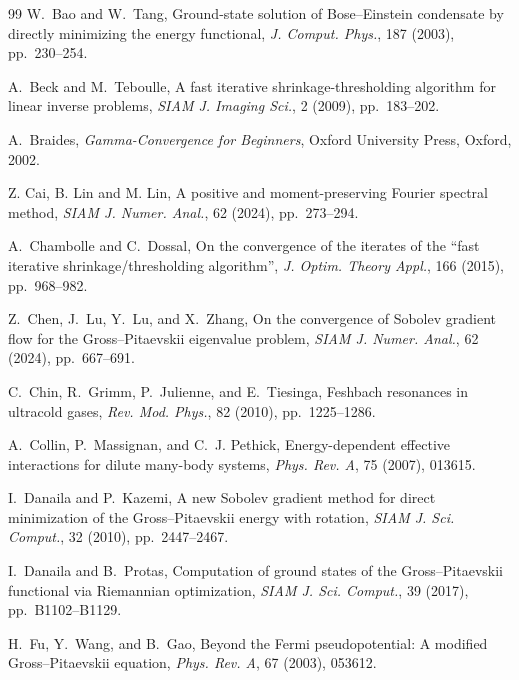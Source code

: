 \documentclass[11pt]{article}
\theoremstyle{plain}
\theoremstyle{definition}
\numberwithin{equation}{section}
\begin{document}
\begin{thebibliography}{99}
W.~Bao and W.~Tang,
\newblock Ground-state solution of Bose--Einstein condensate by
directly minimizing the energy functional,
\newblock \emph{J. Comput. Phys.}, 187 (2003), pp.~230--254.

A.~Beck and M.~Teboulle,
\newblock A fast iterative shrinkage-thresholding algorithm for linear inverse problems,
\newblock \emph{SIAM J. Imaging Sci.}, 2 (2009), pp.~183--202.

A.~Braides,
\newblock \emph{Gamma-Convergence for Beginners},
\newblock Oxford University Press, Oxford, 2002.


Z. Cai, B. Lin and M. Lin,
\newblock A positive and moment-preserving {Fourier} spectral method,
\newblock \emph{SIAM J. Numer. Anal.}, 62 (2024), pp.~273--294.


A.~Chambolle and C.~Dossal,
\newblock On the convergence of the iterates of the ``fast iterative
shrinkage/thresholding algorithm'',
\newblock \emph{J. Optim. Theory Appl.}, 166 (2015), pp.~968--982.

Z.~Chen, J.~Lu, Y.~Lu, and X.~Zhang,
\newblock On the convergence of Sobolev gradient flow for the
Gross--Pitaevskii eigenvalue problem,
\newblock \emph{SIAM J. Numer. Anal.}, 62 (2024), pp.~667--691.

C.~Chin, R.~Grimm, P.~Julienne, and E.~Tiesinga,
\newblock Feshbach resonances in ultracold gases,
\newblock \emph{Rev. Mod. Phys.}, 82 (2010), pp.~1225--1286.

A.~Collin, P.~Massignan, and C.~J. Pethick,
\newblock Energy-dependent effective interactions for dilute
many-body systems,
\newblock \emph{Phys. Rev. A}, 75 (2007), 013615.

I.~Danaila and P.~Kazemi,
\newblock A new Sobolev gradient method for direct minimization of the
Gross--Pitaevskii energy with rotation,
\newblock \emph{SIAM J. Sci. Comput.}, 32 (2010), pp.~2447--2467.

I.~Danaila and B.~Protas,
\newblock Computation of ground states of the Gross--Pitaevskii
functional via Riemannian optimization,
\newblock \emph{SIAM J. Sci. Comput.}, 39 (2017), pp.~B1102--B1129.

H.~Fu, Y.~Wang, and B.~Gao,
\newblock Beyond the Fermi pseudopotential: A modified
Gross--Pitaevskii equation,
\newblock \emph{Phys. Rev. A}, 67 (2003), 053612.


\end{thebibliography}
\end{document}

